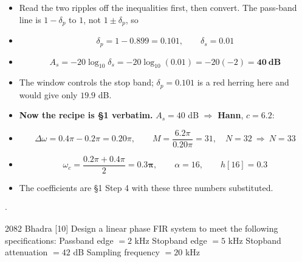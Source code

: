 \begin{itemize}
  \item {} Read the two ripples off
        the inequalities first, then convert. The pass-band line is $1-\delta_p$ to $1$,
        not $1\pm\delta_p$, so
  \item[] \[ \delta_p=1-0.899=\mathbf{0.101},\qquad \delta_s=\mathbf{0.01} \]
  \item[] \[ A_s=-20\log_{10}\delta_s=-20\log_{10}(0.01)
             =-20(-2)=\mathbf{40\ \text{dB}} \]
  \item {} The window controls the
        stop band; $\delta_p=0.101$ is a red herring here and would give only $19.9$ dB.
  \item \textbf{Now the recipe is \S1 verbatim.} $A_s=40$ dB $\Rightarrow$ \textbf{Hann},
        $c=6.2$:
  \item[] \[ \Delta\omega=0.4\pi-0.2\pi=0.20\pi,\qquad
             M=\frac{6.2\pi}{0.20\pi}=31,\quad N=32\ \Rightarrow\ \boxed{N=33} \]
  \item[] \[ \omega_c=\frac{0.2\pi+0.4\pi}{2}=\mathbf{0.3\pi},\qquad \alpha=16,\qquad
             h[16]=0.3 \]
  \item The coefficients are \S1 Step 4 with these three numbers substituted.
\end{itemize}

{\color{sub}\footnotesize {}
\gap$\cdot$\gap {}}

\begin{asked}{2082 Bhadra \textperiodcentered{} [10]}
Design a linear phase FIR system to meet the following specifications:\newline
Passband edge $=2$ kHz \quad Stopband edge $=5$ kHz\newline
Stopband attenuation $=42$ dB \quad Sampling frequency $=20$ kHz
\end{asked}

